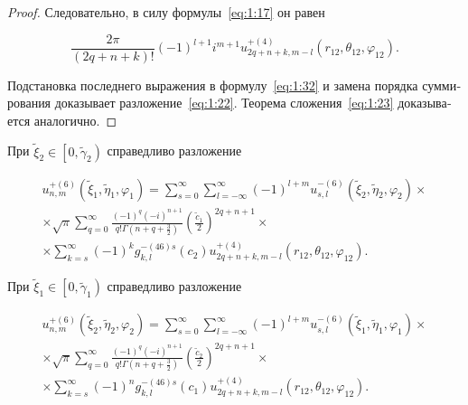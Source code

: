 \begin{russian}
\begin{proof}
Следовательно, в силу формулы~\eqref{eq:1:17} он равен

\[\frac{{2\pi }}{{(2q + n + k)!}}{( - 1)^{l + 1}}{i^{m + 1}}u_{2q + n + k,m - l}^{ + (4)}\left( {{r_{12}},{\theta _{12}},{\varphi _{12}}} \right).\]

Подстановка последнего выражения в формулу~\eqref{eq:1:32} и замена порядка суммирования доказывает разложение~\eqref{eq:1:22}. Теорема сложения~\eqref{eq:1:23} доказывается аналогично.
\end{proof}

\begin{theorem}
При ${\tilde \xi _2} \in \left[ {0,{{\tilde \gamma }_2}} \right)$ справедливо разложение

\begin{multline}\label{eq:1:33}
u_{n,m}^{ + (6)}\left( {{{\tilde \xi }_1},{{\tilde \eta }_1},{\varphi _1}} \right) = \sum\limits_{s = 0}^\infty  {\sum\limits_{l =  - \infty }^\infty  {{{( - 1)}^{l + m}}} } u_{s,l}^{ - (6)}\left( {{{\tilde \xi }_2},{{\tilde \eta }_2},{\varphi _2}} \right) \times \\
\times \sqrt \pi  \sum\limits_{q = 0}^\infty  {\frac{{{{( - 1)}^q}{{( - i)}^{n + 1}}}}{{q!\Gamma \left( {n + q + \frac{3}{2}} \right)}}} {\left( {\frac{{{{\tilde c}_1}}}{2}} \right)^{2q + n + 1}} \times \\
\times \sum\limits_{k = s}^\infty  {{{( - 1)}^k}} g_{k,l}^{ - (46)s}({c_2})u_{2q + n + k,m - l}^{ + (4)}\left( {{r_{12}},{\theta _{12}},{\varphi _{12}}} \right).
\end{multline}

При ${\tilde \xi _1} \in \left[ {0,{{\tilde \gamma }_1}} \right)$ справедливо разложение

\begin{multline}\label{eq:1:34}
u_{n,m}^{ + (6)}\left( {{{\tilde \xi }_2},{{\tilde \eta }_2},{\varphi _2}} \right) = \sum\limits_{s = 0}^\infty  {\sum\limits_{l =  - \infty }^\infty  {{{( - 1)}^{l + m}}} } u_{s,l}^{ - (6)}\left( {{{\tilde \xi }_1},{{\tilde \eta }_1},{\varphi _1}} \right) \times \\
\times \sqrt \pi  \sum\limits_{q = 0}^\infty  {\frac{{{{( - 1)}^q}{{( - i)}^{n + 1}}}}{{q!\Gamma \left( {n + q + \frac{3}{2}} \right)}}} {\left( {\frac{{{{\tilde c}_2}}}{2}} \right)^{2q + n + 1}} \times \\
\times \sum\limits_{k = s}^\infty  {{{( - 1)}^n}} g_{k,l}^{ - (46)s}({c_1})u_{2q + n + k,m - l}^{ + (4)}\left( {{r_{12}},{\theta _{12}},{\varphi _{12}}} \right).
\end{multline}


\end{theorem}
\end{russian}

